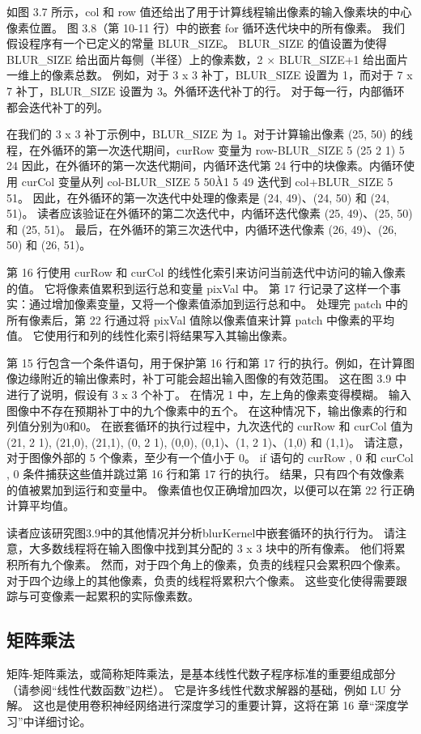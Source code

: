 如图 3.7 所示，col 和 row 值还给出了用于计算线程输出像素的输入像素块的中心像素位置。 图 3.8（第 10-11 行）中的嵌套 for 循环迭代块中的所有像素。 我们假设程序有一个已定义的常量 BLUR\_SIZE。 BLUR\_SIZE 的值设置为使得 BLUR\_SIZE 给出面片每侧（半径）上的像素数，2 × BLUR\_SIZE+1 给出面片一维上的像素总数。 例如，对于 3 x 3 补丁，BLUR\_SIZE 设置为 1，而对于 7 x 7 补丁，BLUR\_SIZE 设置为 3。外循环迭代补丁的行。 对于每一行，内部循环都会迭代补丁的列。

在我们的 3 x 3 补丁示例中，BLUR\_SIZE 为 1。对于计算输出像素 (25, 50) 的线程，在外循环的第一次迭代期间，curRow 变量为 row-BLUR\_SIZE 5 (25 2 1) 5 24 因此，在外循环的第一次迭代期间，内循环迭代第 24 行中的块像素。内循环使用 curCol 变量从列 col-BLUR\_SIZE 5 50À1 5 49 迭代到 col+BLUR\_SIZE 5 51。 因此，在外循环的第一次迭代中处理的像素是 (24, 49)、(24, 50) 和 (24, 51)。 读者应该验证在外循环的第二次迭代中，内循环迭代像素 (25, 49)、(25, 50) 和 (25, 51)。 最后，在外循环的第三次迭代中，内循环迭代像素 (26, 49)、(26, 50) 和 (26, 51)。

第 16 行使用 curRow 和 curCol 的线性化索引来访问当前迭代中访问的输入像素的值。 它将像素值累积到运行总和变量 pixVal 中。 第 17 行记录了这样一个事实：通过增加像素变量，又将一个像素值添加到运行总和中。 处理完 patch 中的所有像素后，第 22 行通过将 pixVal 值除以像素值来计算 patch 中像素的平均值。 它使用行和列的线性化索引将结果写入其输出像素。

第 15 行包含一个条件语句，用于保护第 16 行和第 17 行的执行。例如，在计算图像边缘附近的输出像素时，补丁可能会超出输入图像的有效范围。 这在图 3.9 中进行了说明，假设有 3 x 3 个补丁。 在情况 1 中，左上角的像素变得模糊。 输入图像中不存在预期补丁中的九个像素中的五个。 在这种情况下，输出像素的行和列值分别为0和0。 在嵌套循环的执行过程中，九次迭代的 curRow 和 curCol 值为 (21, 2 1), (21,0), (21,1), (0, 2 1), (0,0), (0,1)、(1, 2 1)、(1,0) 和 (1,1)。 请注意，对于图像外部的 5 个像素，至少有一个值小于 0。 if 语句的 curRow , 0 和 curCol , 0 条件捕获这些值并跳过第 16 行和第 17 行的执行。 结果，只有四个有效像素的值被累加到运行和变量中。 像素值也仅正确增加四次，以便可以在第 22 行正确计算平均值。

读者应该研究图3.9中的其他情况并分析blurKernel中嵌套循环的执行行为。 请注意，大多数线程将在输入图像中找到其分配的 3 x 3 块中的所有像素。 他们将累积所有九个像素。 然而，对于四个角上的像素，负责的线程只会累积四个像素。 对于四个边缘上的其他像素，负责的线程将累积六个像素。 这些变化使得需要跟踪与可变像素一起累积的实际像素数。

\subsection{矩阵乘法}
矩阵-矩阵乘法，或简称矩阵乘法，是基本线性代数子程序标准的重要组成部分（请参阅“线性代数函数”边栏）。 它是许多线性代数求解器的基础，例如 LU 分解。 这也是使用卷积神经网络进行深度学习的重要计算，这将在第 16 章“深度学习”中详细讨论。

